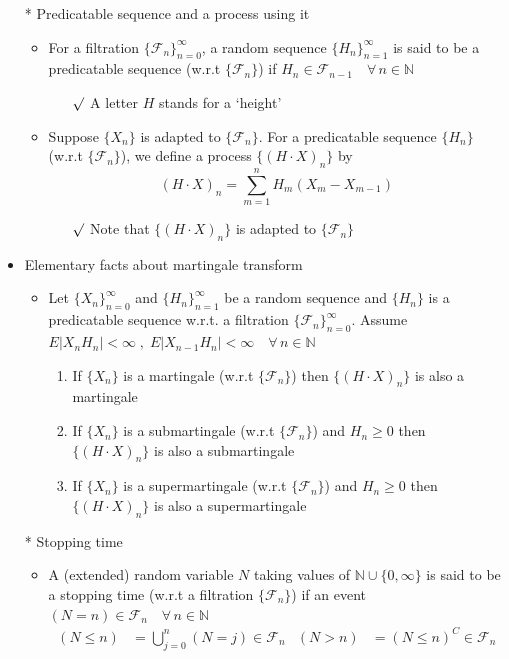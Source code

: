 \documentclass[12pt, A4]{article}
\newcommand{\rmk}{$\surd$}
\newcommand{\N}{\mathbb{N}}
\newcommand{\F}{\mathcal{F}}
\newcommand{\foranyn}{\quad \forall \, n\in \N}
\begin{document}
\begin{itemize}
	\item[*] Predicatable sequence and a process using it
	\begin{itemize}
		\item For a filtration $\{\F_n\}_{n=0}^\infty$, a random sequence $\{H_n\}_{n=1}^\infty$ is said to be a predicatable sequence (w.r.t $\{\F_n\}$) if $H_n\in \F_{n-1}\foranyn$
		\begin{itemize}
			\item[\rmk] A letter $H$ stands for a `height'
		\end{itemize}
		\item Suppose $\{X_n\}$ is adapted to $\{\F_n\}$. For a predicatable sequence $\{H_n\}$ (w.r.t $\{\F_n\}$), we define a process $\{(H\cdot X)_n\}$ by $$(H\cdot X)_n=\sum_{m=1}^n H_m(X_m-X_{m-1}) $$
		\begin{itemize}
			\item[\rmk] Note that $\{(H\cdot X)_n\}$ is adapted to $\{\F_n\}$
		\end{itemize}
	\end{itemize}
	\item Elementary facts about martingale transform 
	\begin{itemize}
		\item Let $\{X_n\}_{n=0}^\infty$ and $\{H_n\}_{n=1}^\infty$ be a random sequence and $\{H_n\}$ is a predicatable sequence w.r.t. a filtration $\{\F_n\}_{n=0}^\infty$. Assume $E|X_nH_n|<\infty\;,\; E|X_{n-1}H_n|<\infty\foranyn$
		\begin{enumerate}
			\item If $\{X_n\}$ is a martingale (w.r.t $\{\F_n\}$) then $\{(H\cdot X)_n\}$ is also a martingale
			\item If $\{X_n\}$ is a submartingale (w.r.t $\{\F_n\}$) and $H_n\geq 0$ then $\{(H\cdot X)_n\}$ is also a submartingale
			\item If $\{X_n\}$ is a supermartingale (w.r.t $\{\F_n\}$) and $H_n\geq 0$ then $\{(H\cdot X)_n\}$ is also a supermartingale
		\end{enumerate}
	\end{itemize}
	\item[*] Stopping time
	\begin{itemize}
		\item A (extended) random variable $N$ taking values of $\N\cup\{0,\infty\}$ is said to be a stopping time (w.r.t a filtration $\{\F_n\}$) if an event $(N=n)\in \F_n\foranyn$
		\begin{align*}
			(N\leq n)&=\bigcup_{j=0}^n (N=j) \in \F_n	&	(N>n)&=(N\leq n)^C\in \F_n \\

\end{align*}
\end{itemize}
\end{itemize}
\end{document}
